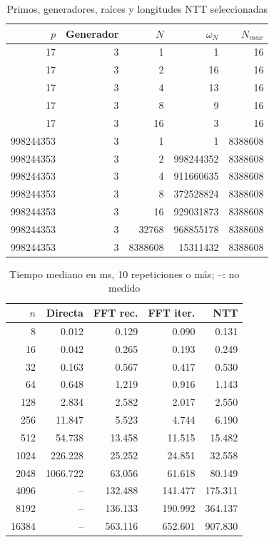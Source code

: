 \begin{table}[htbp]\centering\small
\caption{Primos, generadores, raíces y longitudes NTT seleccionadas}
\label{tab:modulos_raices}
\begin{tabular}{rrrrr}\toprule
$p$ & Generador & $N$ & $\omega_N$ & $N_{max}$ \\
\midrule
17 & 3 & 1 & 1 & 16 \\
17 & 3 & 2 & 16 & 16 \\
17 & 3 & 4 & 13 & 16 \\
17 & 3 & 8 & 9 & 16 \\
17 & 3 & 16 & 3 & 16 \\
998244353 & 3 & 1 & 1 & 8388608 \\
998244353 & 3 & 2 & 998244352 & 8388608 \\
998244353 & 3 & 4 & 911660635 & 8388608 \\
998244353 & 3 & 8 & 372528824 & 8388608 \\
998244353 & 3 & 16 & 929031873 & 8388608 \\
998244353 & 3 & 32768 & 968855178 & 8388608 \\
998244353 & 3 & 8388608 & 15311432 & 8388608 \\
\bottomrule\end{tabular}\end{table}

\begin{table}[htbp]\centering\small
\caption{Tiempo mediano en ms, 10 repeticiones o más; --: no medido}
\label{tab:tiempos}
\begin{tabular}{rrrrr}\toprule
$n$ & Directa & FFT rec. & FFT iter. & NTT \\
\midrule
8 & 0.012 & 0.129 & 0.090 & 0.131 \\
16 & 0.042 & 0.265 & 0.193 & 0.249 \\
32 & 0.163 & 0.567 & 0.417 & 0.530 \\
64 & 0.648 & 1.219 & 0.916 & 1.143 \\
128 & 2.834 & 2.582 & 2.017 & 2.550 \\
256 & 11.847 & 5.523 & 4.744 & 6.190 \\
512 & 54.738 & 13.458 & 11.515 & 15.482 \\
1024 & 226.228 & 25.252 & 24.851 & 32.558 \\
2048 & 1066.722 & 63.056 & 61.618 & 80.149 \\
4096 & -- & 132.488 & 141.477 & 175.311 \\
8192 & -- & 136.133 & 190.992 & 364.137 \\
16384 & -- & 563.116 & 652.601 & 907.830 \\
\bottomrule\end{tabular}\end{table}

